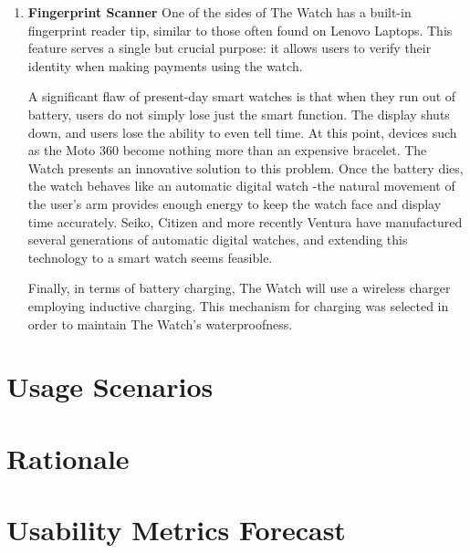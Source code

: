 \documentclass{article}
\begin{document}
\begin{enumerate}
\item \textbf{Fingerprint Scanner}
One of the sides of The Watch has a built-in fingerprint reader tip, similar to those often found on Lenovo Laptops. This feature serves a single but crucial purpose: it allows users to verify their identity when making payments using the watch. 

A significant flaw of present-day smart watches is that when they run out of battery, users do not simply lose just the smart function. The display shuts down, and users lose the ability to even tell time. At this point, devices such as the Moto 360 become nothing more than an expensive bracelet. The Watch presents an innovative solution to this problem. Once the battery dies, the watch behaves like an automatic digital watch -the natural movement of the user's arm provides enough energy to keep the watch face and display time accurately. Seiko, Citizen and more recently Ventura have manufactured several generations of automatic digital watches, and extending this technology to a smart watch seems feasible.

Finally, in terms of battery charging, The Watch will use a wireless charger employing inductive charging. This mechanism for charging was selected in order to maintain The Watch's waterproofness. 
\end{enumerate}

\section{Usage Scenarios}
\section{Rationale}
\section{Usability Metrics Forecast}



\end{document}
